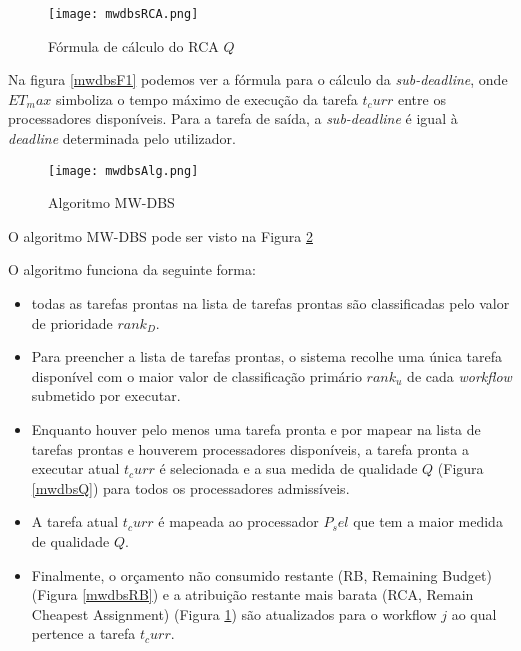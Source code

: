 \begin{figure}[H]
	\centering
	\texttt{[image: mwdbsRCA.png]}
	\caption{Fórmula de cálculo do RCA $Q$}
	\label{mwdbsRCA}
\end{figure}

Na figura \ref{mwdbsF1} podemos ver a fórmula para o cálculo da \textit{sub-deadline}, onde $ET_max$ simboliza o tempo máximo de execução da tarefa $t_curr$ entre os processadores disponíveis. Para a tarefa de saída, a \textit{sub-deadline} é igual à \textit{deadline} determinada pelo utilizador.

\begin{figure}[H]
	\centering
	\texttt{[image: mwdbsAlg.png]}
	\caption{Algoritmo MW-DBS}
	\label{mwdbsAlg}
\end{figure}

O algoritmo MW-DBS pode ser visto na Figura \ref{mwdbsAlg}

O algoritmo funciona da seguinte forma:
\begin{itemize}
	\item todas as tarefas prontas na lista de tarefas prontas são classificadas pelo valor de prioridade $rank_D$.
	\item Para preencher a lista de tarefas prontas, o sistema recolhe uma única tarefa disponível com o maior valor de classificação primário $rank_u$ de cada \textit{workflow} submetido por executar.
	\item Enquanto houver pelo menos uma tarefa pronta e por mapear na lista de tarefas prontas e houverem processadores disponíveis, a tarefa pronta a executar atual $t_curr$ é selecionada e a sua medida de qualidade $Q$ (Figura \ref{mwdbsQ}) para todos os processadores admissíveis.
	\item A tarefa atual $t_curr$ é mapeada ao processador $P_sel$ que tem a maior medida de qualidade $Q$. 
	\item Finalmente, o orçamento não consumido restante (RB, Remaining Budget) (Figura \ref{mwdbsRB}) e a atribuição restante mais barata (RCA, Remain Cheapest Assignment) (Figura \ref{mwdbsRCA}) são atualizados para o workflow $j$ ao qual pertence a tarefa $t_curr$.
\end{itemize}

